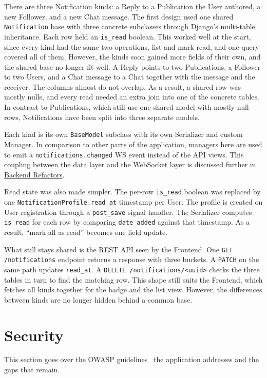 There are three Notification kinds: a Reply to a Publication the User
authored, a new Follower, and a new Chat message. The first design
used one shared \texttt{Notification} base with three concrete
subclasses through Django's multi-table inheritance. Each row held an
\texttt{is\_read} boolean. This worked well at the start, since every
kind had the same two operations, list and mark read, and one query
covered all of them. However, the kinds soon gained more fields of
their own, and the shared base no longer fit well. A Reply points to
two Publications, a Follower to two Users, and a Chat message to a
Chat together with the message and the receiver. The columns almost
do not overlap. As a result, a shared row was mostly nulls, and every
read needed an extra join into one of the concrete tables. In
contrast to Publications, which still use one shared model with
mostly-null rows, Notifications have been split into three separate
models.

Each kind is its own \texttt{BaseModel} subclass with its own
Serializer and custom Manager. In comparison to other parts of the
application, managers here are used to emit a
\texttt{notifications.changed} WS event instead of the API views.
This coupling between the data layer and the WebSocket layer is
discussed further in \hyperref[subsec:imp_be_refactors]{Backend
Refactors}.

Read state was also made simpler. The per-row \texttt{is\_read}
boolean was replaced by one \texttt{NotificationProfile.read\_at}
timestamp per User. The profile is created on User registration
through a \texttt{post\_save} signal handler. The Serializer computes
\texttt{is\_read} for each row by comparing \texttt{date\_added}
against that timestamp. As a result, ``mark all as read'' becomes one
field update.

What still stays shared is the REST API seen by the Frontend. One
\texttt{GET /notifications} endpoint returns a response with three
buckets. A \texttt{PATCH} on the same path updates \texttt{read\_at}.
A \texttt{DELETE /notifications/<uuid>} checks the three tables in
turn to find the matching row. This shape still suits the Frontend,
which fetches all kinds together for the badge and the list view.
However, the differences between kinds are no longer hidden behind a
common base.


\section{Security}\label{sec:security}
This section goes over the OWASP guidelines~\parencite{owasp_cheatsheets} the application
addresses and the gaps that remain.

